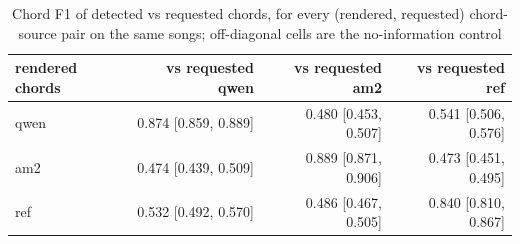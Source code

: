 \begin{table}[t]
\centering
\small
\begin{tabular}{lrrr}
\toprule
rendered chords & vs requested qwen & vs requested am2 & vs requested ref \\
\midrule
qwen & 0.874 [0.859, 0.889] & 0.480 [0.453, 0.507] & 0.541 [0.506, 0.576] \\
am2 & 0.474 [0.439, 0.509] & 0.889 [0.871, 0.906] & 0.473 [0.451, 0.495] \\
ref & 0.532 [0.492, 0.570] & 0.486 [0.467, 0.505] & 0.840 [0.810, 0.867] \\
\bottomrule
\end{tabular}
\caption{Chord F1 of detected vs requested chords, for every (rendered, requested) chord-source pair on the same songs; off-diagonal cells are the no-information control}
\label{tab:backing_chord_f1_matrix_sa3}
\end{table}

